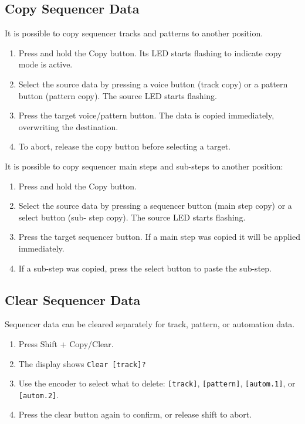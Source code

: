 \subsection{Copy Sequencer Data}\label{copy-sequencer-data}

It is possible to copy sequencer tracks and patterns to another
position.

\begin{enumerate}
\def\labelenumi{\arabic{enumi}.}
\tightlist
\item
  Press and hold the Copy button. Its LED starts flashing to indicate
  copy mode is active.
\item
  Select the source data by pressing a voice button (track copy) or a
  pattern button (pattern copy). The source LED starts flashing.
\item
  Press the target voice/pattern button. The data is copied immediately,
  overwriting the destination.
\item
  To abort, release the copy button before selecting a target.
\end{enumerate}

It is possible to copy sequencer main steps and sub-steps to another
position:

\begin{enumerate}
\def\labelenumi{\arabic{enumi}.}
\tightlist
\item
  Press and hold the Copy button.
\item
  Select the source data by pressing a sequencer button (main step copy)
  or a select button (sub- step copy). The source LED starts flashing.
\item
  Press the target sequencer button. If a main step was copied it will
  be applied immediately.
\item
  If a sub-step was copied, press the select button to paste the
  sub-step.
\end{enumerate}

\subsection{Clear Sequencer Data}\label{clear-sequencer-data}

Sequencer data can be cleared separately for track, pattern, or
automation data.

\begin{enumerate}
\def\labelenumi{\arabic{enumi}.}
\tightlist
\item
  Press Shift + Copy/Clear.
\item
  The display shows \texttt{Clear\ {[}track{]}?}
\item
  Use the encoder to select what to delete: \texttt{{[}track{]}},
  \texttt{{[}pattern{]}}, \texttt{{[}autom.1{]}}, or
  \texttt{{[}autom.2{]}}.
\item
  Press the clear button again to confirm, or release shift to abort.
\end{enumerate}
